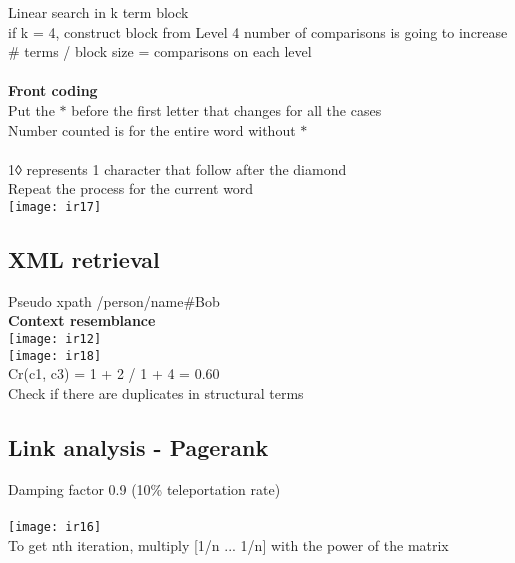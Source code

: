 \documentclass[11pt]{article}
\begin{document}
\begin{multicols*}{3}
Linear search in k term block\\
if k = 4, construct block from Level 4
number of comparisons is going to increase\\
\# terms / block size = comparisons on each level\\\\
\textbf{Front coding}\\
Put the $\ast$ before the first letter that changes for all the cases\\
Number counted is for the entire word without $\ast$\\
\\
1◊ represents 1 character that follow after the diamond\\
Repeat the process for the current word\\
\texttt{[image: ir17]}
\subsection*{XML retrieval}
Pseudo xpath /person/name#Bob\\
\textbf{Context resemblance}\\
\texttt{[image: ir12]}\\
\texttt{[image: ir18]}\\
Cr(c1, c3) = 1 + 2 / 1 + 4 = 0.60
\\
Check if there are duplicates in structural terms 
\subsection*{Link analysis - Pagerank}
Damping factor 0.9 (10\% teleportation rate)\\\\
\texttt{[image: ir16]}
\\
To get nth iteration, multiply [1/n ... 1/n] with the power of the matrix 
\end{multicols*}
\end{document}
